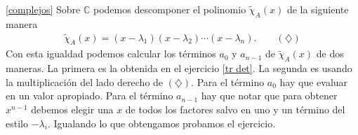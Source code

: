 \ref{complejos} Sobre $\mathbb{C}$ podemos descomponer el polinomio $\tilde\chi_A(x)$ de la siguiente manera
\begin{align*}
\tilde\chi_A(x)=(x-\lambda_1)(x-\lambda_2)\cdots(x-\lambda_n). \qquad (\diamondsuit)
\end{align*}
Con esta igualdad podemos calcular los términos $a_0$ y $a_{n-1}$ de $\tilde\chi_A(x)$ de dos maneras. La primera es la obtenida en el ejercicio \ref{tr det}. La segunda es usando la multiplicación del lado derecho de $(\diamondsuit)$. Para el término $a_0$ hay que evaluar en un valor apropiado. Para el término $a_{n-1}$ hay que notar que para obtener $x^{n-1}$ debemos elegir una $x$ de todos los factores salvo en uno y un término del estilo $-\lambda_i$. Igualando lo que obtengamos probamos el ejercicio.

